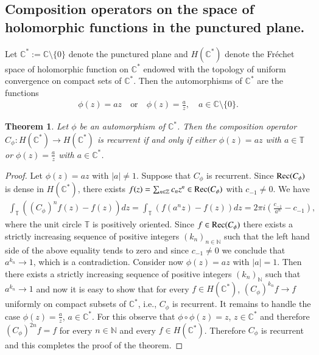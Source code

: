 \documentclass[12pt,leqno]{amsart}
\theoremstyle{plain}
\newtheorem{theorem}[equation]{Theorem}
\theoremstyle{definition}
\numberwithin{equation}{section}
\begin{document}
\subsection{Composition operators on the space of holomorphic functions in the punctured plane.} Let ${\mathbb C}^*:= \mathbb C \setminus \{ 0 \}$ denote the punctured plane and $H({\mathbb C}^*)$ denote the Fr\'echet space of holomorphic function on ${\mathbb C}^*$ endowed with the topology of uniform convergence on compact sets of ${\mathbb C}^*$. Then the automorphisms of ${\mathbb C}^*$ are the functions 
\begin{align*}
	\phi (z)=az \quad \text{or} \quad \phi (z)=\frac{a}{z}, \quad a\in \mathbb C\setminus \{ 0\} . 
\end{align*}

\begin{theorem}
	\label{t.punct-rec} Let $\phi$ be an automorphism of ${\mathbb C}^*$. Then the composition operator $C_{\phi }: H({\mathbb C}^*) \to H({\mathbb C}^*)$ is recurrent if and only if either $\phi (z)=az$ with $a\in \mathbb{T}$ or $\phi (z)=\frac{a}{z}$ with $a\in {\mathbb C}^*$. 
\end{theorem}

\begin{proof}
	Let $\phi (z)=az$ with $|a|\neq 1$. Suppose that $C_{\phi }$ is recurrent. Since ${\textnormal{Rec}}(C_{\phi })$ is dense in $H({\mathbb C}^*)$, there exists $f(z)=\sum_{n\in \mathbb Z}c_nz^n \in {\textnormal{Rec}}(C_{\phi })$ with $c_{-1}\neq 0$. We have 
	\begin{align*}
		\int_{\mathbb T}((C_{\phi })^nf(z)-f(z))dz=\int_{\mathbb T}(f(a^nz)-f(z))dz=2\pi i(\frac{c_{-1}}{a^n}-c_{-1}), 
	\end{align*}
	where the unit circle $\mathbb T$ is positively oriented. Since $f\in {\textnormal{Rec}}(C_{\phi })$ there exists a strictly increasing sequence of positive integers $(k_n)_{n\in\mathbb N}$ such that the left hand side of the above equality tends to zero and since $c_{-1}\neq 0$ we conclude that $a^{k_n}\to 1$, which is a contradiction. Consider now $\phi (z)=az$ with $|a|=1$. Then there exists a strictly increasing sequence of positive integers $(k_n)_{\mathbb N}$ such that $a^{k_n}\to 1$ and now it is easy to show that for every $f\in H({\mathbb C}^* )$, $(C_{\phi })^{k_n}f\to f$ uniformly on compact subsets of ${\mathbb C}^*$, i.e., $C_{\phi }$ is recurrent. It remains to handle the case $\phi (z)=\frac{a}{z}$, $a\in {\mathbb C}^*$. For this observe that $\phi \circ \phi (z)=z$, $z\in {\mathbb C}^*$ and therefore $(C_{\phi })^{2n}f=f$ for every $n\in \mathbb{N}$ and every $f\in H({\mathbb C}^* )$. Therefore $C_{\phi }$ is recurrent and this completes the proof of the theorem. 
\end{proof}
\end{document}

